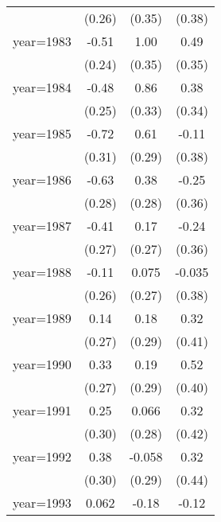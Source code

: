 \begin{sidewaystable}[htbp]
\begin{tabular}{l*{3}{c}}
                &   (0.26)         &   (0.35)         &   (0.38)         \\
\addlinespace
year=1983       &    -0.51\sym{**} &     1.00\sym{***}&     0.49         \\
                &   (0.24)         &   (0.35)         &   (0.35)         \\
\addlinespace
year=1984       &    -0.48\sym{*}  &     0.86\sym{**} &     0.38         \\
                &   (0.25)         &   (0.33)         &   (0.34)         \\
\addlinespace
year=1985       &    -0.72\sym{**} &     0.61\sym{**} &    -0.11         \\
                &   (0.31)         &   (0.29)         &   (0.38)         \\
\addlinespace
year=1986       &    -0.63\sym{**} &     0.38         &    -0.25         \\
                &   (0.28)         &   (0.28)         &   (0.36)         \\
\addlinespace
year=1987       &    -0.41         &     0.17         &    -0.24         \\
                &   (0.27)         &   (0.27)         &   (0.36)         \\
\addlinespace
year=1988       &    -0.11         &    0.075         &   -0.035         \\
                &   (0.26)         &   (0.27)         &   (0.38)         \\
\addlinespace
year=1989       &     0.14         &     0.18         &     0.32         \\
                &   (0.27)         &   (0.29)         &   (0.41)         \\
\addlinespace
year=1990       &     0.33         &     0.19         &     0.52         \\
                &   (0.27)         &   (0.29)         &   (0.40)         \\
\addlinespace
year=1991       &     0.25         &    0.066         &     0.32         \\
                &   (0.30)         &   (0.28)         &   (0.42)         \\
\addlinespace
year=1992       &     0.38         &   -0.058         &     0.32         \\
                &   (0.30)         &   (0.29)         &   (0.44)         \\
\addlinespace
year=1993       &    0.062         &    -0.18         &    -0.12         \\

\end{tabular}
\end{sidewaystable}
